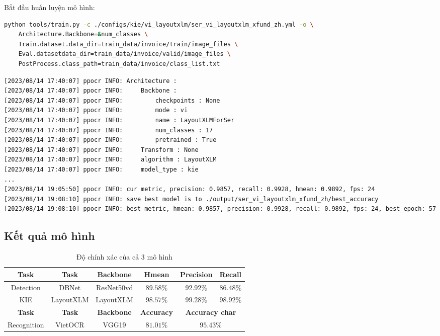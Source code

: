 Bắt đầu huấn luyện mô hình:
\begin{lstlisting}[language=bash]
python tools/train.py -c ./configs/kie/vi_layoutxlm/ser_vi_layoutxlm_xfund_zh.yml -o \
    Architecture.Backbone=&num_classes \
    Train.dataset.data_dir=train_data/invoice/train/image_files \
    Eval.datasetdata_dir=train_data/invoice/valid/image_files \
    PostProcess.class_path=train_data/invoice/class_list.txt
\end{lstlisting}

\begin{lstlisting}[language=bash]
[2023/08/14 17:40:07] ppocr INFO: Architecture : 
[2023/08/14 17:40:07] ppocr INFO:     Backbone : 
[2023/08/14 17:40:07] ppocr INFO:         checkpoints : None
[2023/08/14 17:40:07] ppocr INFO:         mode : vi
[2023/08/14 17:40:07] ppocr INFO:         name : LayoutXLMForSer
[2023/08/14 17:40:07] ppocr INFO:         num_classes : 17
[2023/08/14 17:40:07] ppocr INFO:         pretrained : True
[2023/08/14 17:40:07] ppocr INFO:     Transform : None
[2023/08/14 17:40:07] ppocr INFO:     algorithm : LayoutXLM
[2023/08/14 17:40:07] ppocr INFO:     model_type : kie
...
[2023/08/14 19:05:50] ppocr INFO: cur metric, precision: 0.9857, recall: 0.9928, hmean: 0.9892, fps: 24
[2023/08/14 19:08:10] ppocr INFO: save best model is to ./output/ser_vi_layoutxlm_xfund_zh/best_accuracy
[2023/08/14 19:08:10] ppocr INFO: best metric, hmean: 0.9857, precision: 0.9928, recall: 0.9892, fps: 24, best_epoch: 57
\end{lstlisting}

\subsection{Kết quả mô hình}
\begin{table}[h]
    \centering
    \begin{tabular}{ | c | c | c | c | c | c | } 
        \hline
        \textbf{Task} & \textbf{Task} & \textbf{Backbone} & \textbf{Hmean} & \textbf{Precision} & \textbf{Recall} \\ 
        \hline
        Detection & DBNet & ResNet50vd & $89.58\%$ & $92.92\%$ & $86.48\%$ \\ 
        \hline
        KIE & LayoutXLM & LayoutXLM & $98.57\%$ & $99.28\%$ & $98.92\%$ \\ 
        \hline
        \hline
        \textbf{Task} & \textbf{Task} & \textbf{Backbone} & \textbf{Accuracy} & \multicolumn{2}{c|}{\textbf{Accuracy char}}   \\ 
        \hline
        Recognition & VietOCR & VGG19 & $81.01\%$ & \multicolumn{2}{c|}{$95.43\%$} \\ 
        \hline
    \end{tabular}
    \caption{Độ chính xác của cả 3 mô hình}
    \label{table:1}
\end{table}


